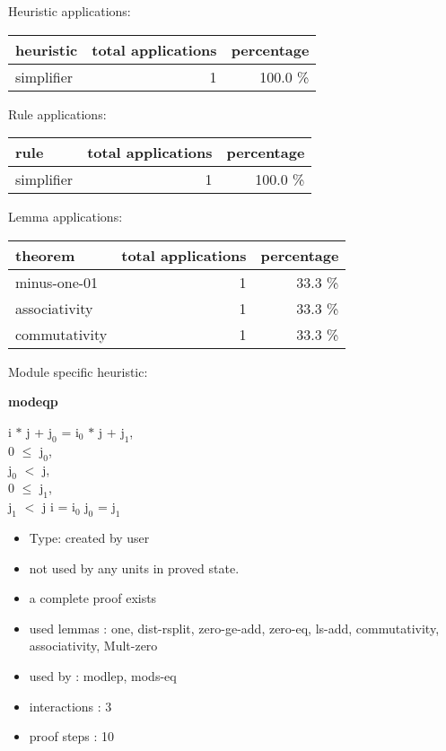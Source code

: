 \documentclass[a4paper]{article}
\begin{document}
\medskip


Heuristic applications:

\begin{supertabular}{l|r|r}
heuristic	& total applications & percentage \\ \hline
simplifier & 1 & 100.0 \% \\

\end{supertabular}

Rule applications:

\begin{supertabular}{l|r|r}
rule	        & total applications & percentage \\ \hline
simplifier & 1 & 100.0 \% \\

\end{supertabular}

Lemma applications:

\begin{supertabular}{l|r|r}
theorem	        & total applications & percentage \\ \hline
minus-one-01 & 1 & 33.3 \% \\
associativity & 1 & 33.3 \% \\
commutativity & 1 & 33.3 \% \\

\end{supertabular}

Module specific heuristic:

\pagebreak

{\LARGE\bf modeqp}\label{lemma-modeqp}

\medskip

i $*$ j + $\mbox{j}_{0}$ = $\mbox{i}_{0}$ $*$ j + $\mbox{j}_{1}$, \\
0 $\le$ $\mbox{j}_{0}$, \\
$\mbox{j}_{0}$ $<$ j, \\
0 $\le$ $\mbox{j}_{1}$, \\
$\mbox{j}_{1}$ $<$ j \Fol i = $\mbox{i}_{0}$ \And $\mbox{j}_{0}$ = $\mbox{j}_{1}$

\begin{itemize}

\item Type: created by user

\item not used by any units in proved state.
\item       a complete proof exists
\item       used lemmas  : one, dist-rsplit, zero-ge-add, zero-eq, ls-add, commutativity, associativity, Mult-zero
\item       used by      : modlep, mods-eq
\item       interactions : 3
\item       proof steps  : 10
\end{itemize}
\end{document}

